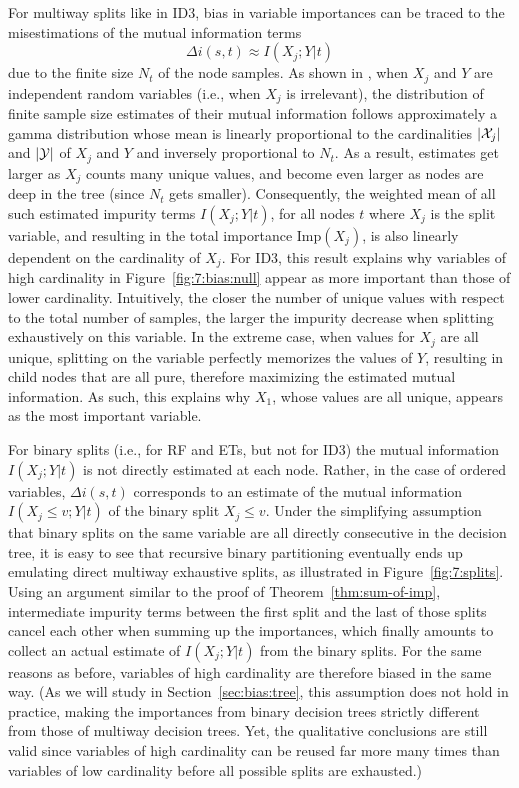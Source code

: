 For multiway splits like in ID3, bias in variable importances can be traced to the
misestimations of the mutual information terms
\begin{equation}
\Delta i(s, t) \approx I(X_j;Y|t)
\end{equation}
due to the finite size $N_t$ of the node samples. As shown in
\citep{goebel:2005}, when $X_j$ and $Y$ are independent random variables (i.e.,
when $X_j$ is irrelevant), the distribution of finite sample size estimates of
their mutual information  follows approximately a gamma distribution whose mean
is linearly proportional to the cardinalities $|{\cal X}_j|$ and $|{\cal Y}|$
of $X_j$ and $Y$ and inversely proportional to $N_t$.
As a result, estimates get larger as $X_j$ counts many unique values, and
become even larger as nodes are deep in the tree (since $N_t$ gets smaller).
Consequently, the weighted mean of all such estimated impurity terms
$I(X_j;Y|t)$, for all nodes $t$ where $X_j$ is the split variable, and
resulting in the total importance $\text{Imp}(X_j)$, is also linearly dependent
on the cardinality of $X_j$. For ID3, this result explains why variables of
high cardinality in Figure~\ref{fig:7:bias:null} appear as more important than
those of lower cardinality. Intuitively, the closer the number of unique values
with respect to the total number of samples, the larger the impurity decrease
when splitting exhaustively on this variable. In the extreme case, when values
for $X_j$ are all unique, splitting on the variable perfectly memorizes the
values of $Y$, resulting in child nodes that are all pure, therefore maximizing
the estimated mutual information. As such, this explains why $X_1$, whose
values are all unique, appears as the most important variable.

For binary splits (i.e., for RF and ETs, but not for ID3) the mutual
information $I(X_j;Y|t)$ is not directly estimated at each node. Rather, in the
case of ordered variables, $\Delta i(s, t)$ corresponds to an estimate of the
mutual information $I(X_j\leq v;Y|t)$ of the binary split $X_j \leq v$. Under
the simplifying assumption that binary splits on the same variable are all
directly consecutive in the decision tree,  it is easy to see that recursive
binary partitioning eventually ends up emulating direct multiway exhaustive
splits, as illustrated in Figure~\ref{fig:7:splits}. Using an argument similar
to the proof of Theorem~\ref{thm:sum-of-imp}, intermediate impurity terms
between the first split and the last of those splits cancel each other when
summing up the importances, which finally amounts to collect an actual estimate
of $I(X_j;Y|t)$ from the binary splits. For the same reasons as before,
variables of high cardinality are therefore biased in the same way. (As we will
study in Section~\ref{sec:bias:tree}, this assumption does not hold in
practice, making the importances from binary decision trees strictly different
from those of multiway decision trees. Yet, the qualitative conclusions are
still valid since variables of high cardinality can be reused far more many
times than variables of low cardinality before all possible splits are
exhausted.)

